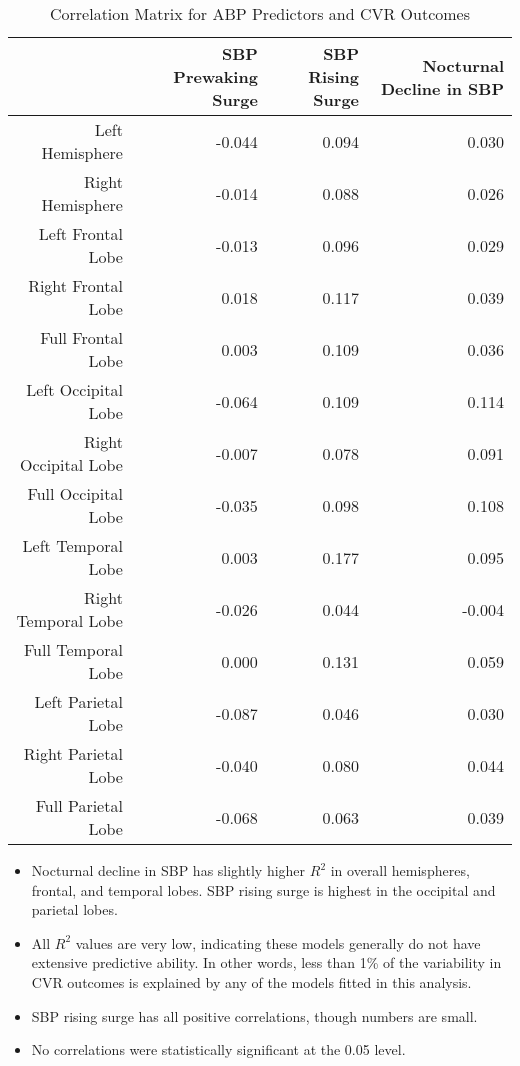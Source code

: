 \documentclass[10pt]{article}\usepackage[]{graphicx}\usepackage[]{color}
\begin{document}
\begin{table}[ht]
\centering
\caption{Correlation Matrix for ABP Predictors and CVR Outcomes} 
\begin{tabular}{rrrr}
  \toprule
 & SBP Prewaking Surge & SBP Rising Surge & Nocturnal Decline in SBP \\ 
  \midrule
Left Hemisphere & -0.044 & 0.094 & 0.030 \\ 
  Right Hemisphere & -0.014 & 0.088 & 0.026 \\ 
  Left Frontal Lobe & -0.013 & 0.096 & 0.029 \\ 
  Right Frontal Lobe & 0.018 & 0.117 & 0.039 \\ 
  Full Frontal Lobe & 0.003 & 0.109 & 0.036 \\ 
  Left Occipital Lobe & -0.064 & 0.109 & 0.114 \\ 
  Right Occipital Lobe & -0.007 & 0.078 & 0.091 \\ 
  Full Occipital Lobe & -0.035 & 0.098 & 0.108 \\ 
  Left Temporal Lobe & 0.003 & 0.177 & 0.095 \\ 
  Right Temporal Lobe & -0.026 & 0.044 & -0.004 \\ 
  Full Temporal Lobe & 0.000 & 0.131 & 0.059 \\ 
  Left Parietal Lobe & -0.087 & 0.046 & 0.030 \\ 
  Right Parietal Lobe & -0.040 & 0.080 & 0.044 \\ 
  Full Parietal Lobe & -0.068 & 0.063 & 0.039 \\ 
   \bottomrule
\end{tabular}
\end{table}


\begin{itemize}
  \item Nocturnal decline in SBP has slightly higher $R^2$ in overall hemispheres, frontal, and temporal lobes. SBP rising surge is highest in the occipital and parietal lobes.
  \item All $R^2$ values are very low, indicating these models generally do not have extensive predictive ability. In other words, less than 1\% of the variability in CVR outcomes is explained by any of the models fitted in this analysis.
  \item SBP rising surge has all positive correlations, though numbers are small.
  \item No correlations were statistically significant at the 0.05 level.
\end{itemize}
\end{document}
